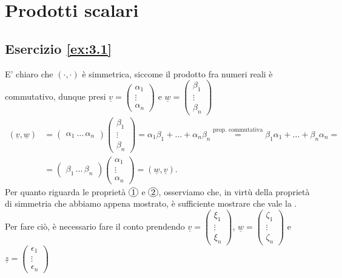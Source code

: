 \section{Prodotti scalari}
\subsection*{Esercizio \ref{ex:3.1}}
E' chiaro che $(\cdot, \cdot)$ è simmetrica, siccome il prodotto fra numeri reali è commutativo, dunque presi $\underline{v} = \begin{pmatrix}
    \alpha_1 \\
    \vdots \\
    \alpha_n
\end{pmatrix}$ e $\underline{w} = \begin{pmatrix} \beta_1 \\ \vdots \\ \beta_n \end{pmatrix}$
\begin{align}
    (\underline{v}, \underline{w}) &= \begin{pmatrix} \alpha_1 \ \ldots \, \alpha_n \end{pmatrix} \begin{pmatrix} \beta_1 \\ \vdots \\ \beta_n \end{pmatrix} = \alpha_1 \beta_1 + \ldots + \alpha_n \beta_n \stackrel{\text{prop. commutativa}}{=} \beta_1 \alpha_1 + \ldots + \beta_n \alpha_n =  \\
    &=\begin{pmatrix} \beta_1 \, \ldots \, \beta_n \end{pmatrix} \begin{pmatrix} \alpha_1 \\ \vdots \\ \alpha_n \end{pmatrix} = (\underline{w}, \underline{v}).
\end{align}
Per quanto riguarda le proprietà $\circled{1}$ e $\circled{2}$, osserviamo che, in virtù della proprietà di simmetria che abbiamo appena mostrato, è sufficiente mostrare che vale la . Per fare ciò, è necessario fare il conto prendendo $\underline{v} = \begin{pmatrix} \xi_1 \\ \vdots \\ \xi_n \end{pmatrix}$, $\underline{w} = \begin{pmatrix} \zeta_1 \\ \vdots \\ \zeta_n \end{pmatrix}$ e $\underline{z} = \begin{pmatrix} \epsilon_1 \\ \vdots \\ \epsilon_n \end{pmatrix}$

